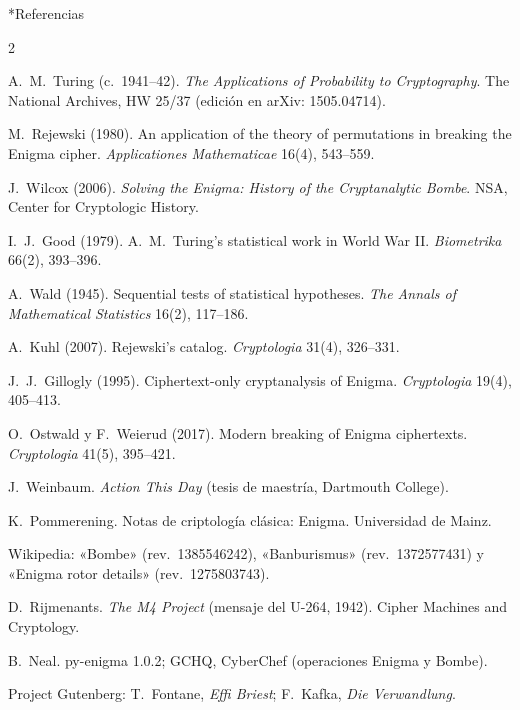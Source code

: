 \documentclass[11pt]{article}
\makeatletter
\renewcommand\section{\@startsection{section}{1}{\z@}{-1.6ex plus -0.5ex}{0.6ex}{\normalfont\large\bfseries}}
\makeatother
\begin{document}
\section*{Referencias}
{\footnotesize
\begin{multicols}{2}
\begin{enumerate}[label={[\arabic*]},leftmargin=2em,itemsep=0pt]
  \item A.~M.~Turing (c.~1941--42). \emph{The Applications of Probability to Cryptography}.
  The National Archives, HW 25/37 (edición en arXiv: 1505.04714).
  \item M.~Rejewski (1980). An application of the theory of permutations in breaking the Enigma
  cipher. \emph{Applicationes Mathematicae} 16(4), 543--559.
  \item J.~Wilcox (2006). \emph{Solving the Enigma: History of the Cryptanalytic Bombe}. NSA,
  Center for Cryptologic History.
  \item I.~J.~Good (1979). A.~M.~Turing's statistical work in World War II. \emph{Biometrika}
  66(2), 393--396.
  \item A.~Wald (1945). Sequential tests of statistical hypotheses. \emph{The Annals of
  Mathematical Statistics} 16(2), 117--186.
  \item A.~Kuhl (2007). Rejewski's catalog. \emph{Cryptologia} 31(4), 326--331.
  \item J.~J.~Gillogly (1995). Ciphertext-only cryptanalysis of Enigma. \emph{Cryptologia}
  19(4), 405--413.
  \item O.~Ostwald y F.~Weierud (2017). Modern breaking of Enigma ciphertexts.
  \emph{Cryptologia} 41(5), 395--421.
  \item J.~Weinbaum. \emph{Action This Day} (tesis de maestría, Dartmouth College).
  \item K.~Pommerening. Notas de criptología clásica: Enigma. Universidad de Mainz.
  \item Wikipedia: «Bombe» (rev.~1385546242), «Banburismus» (rev.~1372577431) y «Enigma rotor
  details» (rev.~1275803743).
  \item D.~Rijmenants. \emph{The M4 Project} (mensaje del U-264, 1942). Cipher Machines and
  Cryptology.
  \item B.~Neal. py-enigma 1.0.2; GCHQ, CyberChef (operaciones Enigma y Bombe).
  \item Project Gutenberg: T.~Fontane, \emph{Effi Briest}; F.~Kafka, \emph{Die Verwandlung}.
\end{enumerate}
\end{multicols}
}
\end{document}

